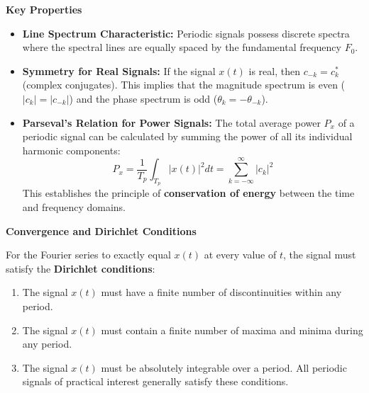 \textbf{Key Properties}

\begin{itemize}
\tightlist
\item
  \textbf{Line Spectrum Characteristic:} Periodic signals possess
  discrete spectra where the spectral lines are equally spaced by the
  fundamental frequency \(F_0\).
\item
  \textbf{Symmetry for Real Signals:} If the signal \(x(t)\) is real,
  then \(c_{-k} = c_k^*\) (complex conjugates). This implies that the
  magnitude spectrum is even (\(|c_k| = |c_{-k}|\)) and the phase
  spectrum is odd (\(\theta_k = -\theta_{-k}\)).
\item
  \textbf{Parseval's Relation for Power Signals:} The total average
  power \(P_x\) of a periodic signal can be calculated by summing the
  power of all its individual harmonic components:
  \[P_x = \frac{1}{T_p} \int_{T_p} |x(t)|^2 dt = \sum_{k=-\infty}^{\infty} |c_k|^2\]
  This establishes the principle of \textbf{conservation of energy}
  between the time and frequency domains.
\end{itemize}

\textbf{Convergence and Dirichlet Conditions}

For the Fourier series to exactly equal \(x(t)\) at every value of
\(t\), the signal must satisfy the \textbf{Dirichlet conditions}:

\begin{enumerate}
\def\labelenumi{\arabic{enumi}.}
\tightlist
\item
  The signal \(x(t)\) must have a finite number of discontinuities
  within any period.
\item
  The signal \(x(t)\) must contain a finite number of maxima and minima
  during any period.
\item
  The signal \(x(t)\) must be absolutely integrable over a period. All
  periodic signals of practical interest generally satisfy these
  conditions.
\end{enumerate}

